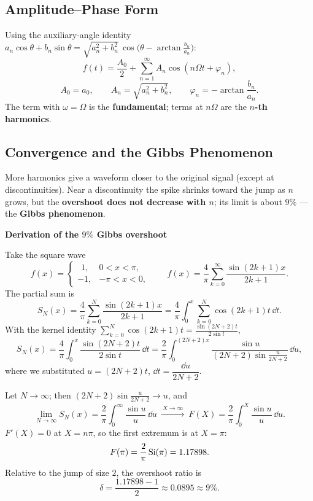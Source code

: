 \subsection{Amplitude--Phase Form}

Using the auxiliary-angle identity
$a_n\cos\theta+b_n\sin\theta=\sqrt{a_n^{2}+b_n^{2}}\,\cos\bigl(\theta-\arctan\frac{b_n}{a_n}\bigr)$:
\[
    f(t)=\frac{A_0}{2}+\sum_{n=1}^{\infty}A_n\cos(n\Omega t+\varphi_n),
\]
\[
    A_0=a_0,\qquad A_n=\sqrt{a_n^{2}+b_n^{2}},\qquad
    \varphi_n=-\arctan\frac{b_n}{a_n}.
\]
The term with $\omega=\Omega$ is the \textbf{fundamental}; terms at $n\Omega$
are the \textbf{$n$-th harmonics}.

\subsection{Convergence and the Gibbs Phenomenon}

More harmonics give a waveform closer to the original signal (except at
discontinuities). Near a discontinuity the spike shrinks toward the jump as
$n$ grows, but the \textbf{overshoot does not decrease with $n$}; its limit is
about $9\%$ --- the \textbf{Gibbs phenomenon}.

\begin{note}
\textbf{Derivation of the $9\%$ Gibbs overshoot}

Take the square wave
\[
    f(x)=
    \begin{cases}
        \ \ 1, & 0<x<\pi,\\
        -1, & -\pi<x<0,
    \end{cases}
    \qquad
    f(x)=\frac{4}{\pi}\sum_{k=0}^{\infty}\frac{\sin(2k+1)x}{2k+1}.
\]
The partial sum is
\[
    S_N(x)=\frac{4}{\pi}\sum_{k=0}^{N}\frac{\sin(2k+1)x}{2k+1}
    =\frac{4}{\pi}\int_0^{x}\sum_{k=0}^{N}\cos(2k+1)t\,\dd t .
\]
With the kernel identity
$\displaystyle\sum_{k=0}^{N}\cos(2k+1)t=\frac{\sin(2N+2)t}{2\sin t}$,
\[
    S_N(x)=\frac{4}{\pi}\int_0^{x}\frac{\sin(2N+2)t}{2\sin t}\,\dd t
    =\frac{2}{\pi}\int_0^{(2N+2)x}
    \frac{\sin u}{(2N+2)\sin\frac{u}{2N+2}}\,\dd u,
\]
where we substituted $u=(2N+2)t$, $\dd t=\dfrac{\dd u}{2N+2}$.

Let $N\to\infty$; then $(2N+2)\sin\frac{u}{2N+2}\to u$, and
\[
    \lim_{N\to\infty}S_N(x)=\frac{2}{\pi}\int_0^{\infty}\frac{\sin u}{u}\,\dd u
    \ \xrightarrow{\ X\to\infty\ }\
    F(X)=\frac{2}{\pi}\int_0^{X}\frac{\sin u}{u}\,\dd u .
\]
$F'(X)=0$ at $X=n\pi$, so the first extremum is at $X=\pi$:
\[
    F(\pi)=\frac{2}{\pi}\operatorname{Si}(\pi)=1.17898 .
\]
Relative to the jump of size $2$, the overshoot ratio is
\[
    \delta=\frac{1.17898-1}{2}\approx 0.0895\approx 9\% .
\]
\end{note}

